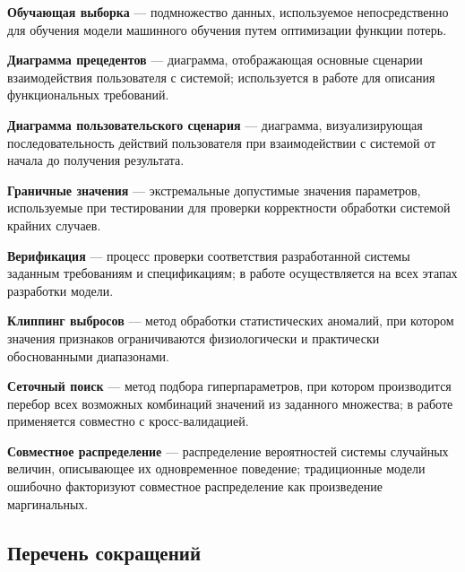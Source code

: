 \textbf{Обучающая выборка} --- подмножество данных, используемое непосредственно для обучения модели машинного обучения путем оптимизации функции потерь.

\textbf{Диаграмма прецедентов} --- диаграмма, отображающая основные сценарии взаимодействия пользователя с системой; используется в работе для описания функциональных требований.

\textbf{Диаграмма пользовательского сценария} --- диаграмма, визуализирующая последовательность действий пользователя при взаимодействии с системой от начала до получения результата.

\textbf{Граничные значения} --- экстремальные допустимые значения параметров, используемые при тестировании для проверки корректности обработки системой крайних случаев.

\textbf{Верификация} --- процесс проверки соответствия разработанной системы заданным требованиям и спецификациям; в работе осуществляется на всех этапах разработки модели.

\textbf{Клиппинг выбросов} --- метод обработки статистических аномалий, при котором значения признаков ограничиваются физиологически и практически обоснованными диапазонами.

\textbf{Сеточный поиск} --- метод подбора гиперпараметров, при котором производится перебор всех возможных комбинаций значений из заданного множества; в работе применяется совместно с кросс-валидацией.

\textbf{Совместное распределение} --- распределение вероятностей системы случайных величин, описывающее их одновременное поведение; традиционные модели ошибочно факторизуют совместное распределение как произведение маргинальных.

\subsection*{Перечень сокращений}

